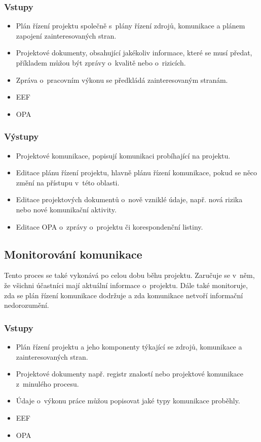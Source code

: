 \subsubsection*{Vstupy}
\begin{itemize}
    \item Plán řízení projektu společně s~plány řízení zdrojů, komunikace a plánem zapojení zainteresovaných stran.
    \item Projektové dokumenty, obsahující jakékoliv informace, které se musí předat, příkladem můžou být zprávy o~kvalitě nebo o~rizicích.
    \item Zpráva o~pracovním výkonu se předkládá zainteresovaným stranám.
    \item EEF
    \item OPA
\end{itemize}
\subsubsection*{Výstupy}
\begin{itemize}
    \item Projektové komunikace, popisují komunikaci probíhající na projektu.
    \item Editace plánu řízení projektu, hlavně plánu řízení komunikace, pokud se něco změní na přístupu v~této oblasti.
    \item Editace projektových dokumentů o~nově vzniklé údaje, např. nová rizika nebo nové komunikační aktivity.
    \item Editace OPA o~zprávy o~projektu či korespondenční listiny.
\end{itemize}

\subsection*{Monitorování komunikace}

Tento proces se také vykonává po celou dobu běhu projektu. Zaručuje se v~něm, že všichni účastníci mají aktuální informace o~projektu. Dále také monitoruje, zda se plán řízení komunikace dodržuje a zda komunikace netvoří informační nedorozumění.

\subsubsection*{Vstupy}
\begin{itemize}
    \item Plán řízení projektu a jeho komponenty týkající se zdrojů, komunikace a zainteresovaných stran.
    \item Projektové dokumenty např. registr znalostí nebo projektové komunikace z~minulého procesu.
    \item Údaje o~výkonu práce můžou popisovat jaké typy komunikace proběhly.
    \item EEF
    \item OPA
\end{itemize}
